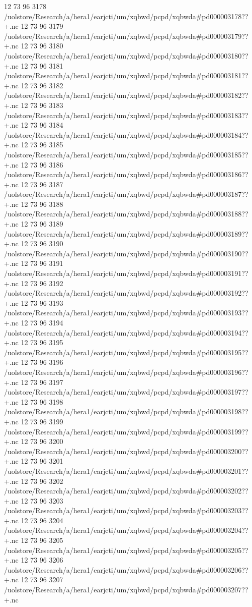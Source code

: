 12 73 96
3178
/uolstore/Research/a/hera1/earjcti/um/xqbwd/pcpd/xqbwda#pd000003178??+.nc
12 73 96
3179
/uolstore/Research/a/hera1/earjcti/um/xqbwd/pcpd/xqbwda#pd000003179??+.nc
12 73 96
3180
/uolstore/Research/a/hera1/earjcti/um/xqbwd/pcpd/xqbwda#pd000003180??+.nc
12 73 96
3181
/uolstore/Research/a/hera1/earjcti/um/xqbwd/pcpd/xqbwda#pd000003181??+.nc
12 73 96
3182
/uolstore/Research/a/hera1/earjcti/um/xqbwd/pcpd/xqbwda#pd000003182??+.nc
12 73 96
3183
/uolstore/Research/a/hera1/earjcti/um/xqbwd/pcpd/xqbwda#pd000003183??+.nc
12 73 96
3184
/uolstore/Research/a/hera1/earjcti/um/xqbwd/pcpd/xqbwda#pd000003184??+.nc
12 73 96
3185
/uolstore/Research/a/hera1/earjcti/um/xqbwd/pcpd/xqbwda#pd000003185??+.nc
12 73 96
3186
/uolstore/Research/a/hera1/earjcti/um/xqbwd/pcpd/xqbwda#pd000003186??+.nc
12 73 96
3187
/uolstore/Research/a/hera1/earjcti/um/xqbwd/pcpd/xqbwda#pd000003187??+.nc
12 73 96
3188
/uolstore/Research/a/hera1/earjcti/um/xqbwd/pcpd/xqbwda#pd000003188??+.nc
12 73 96
3189
/uolstore/Research/a/hera1/earjcti/um/xqbwd/pcpd/xqbwda#pd000003189??+.nc
12 73 96
3190
/uolstore/Research/a/hera1/earjcti/um/xqbwd/pcpd/xqbwda#pd000003190??+.nc
12 73 96
3191
/uolstore/Research/a/hera1/earjcti/um/xqbwd/pcpd/xqbwda#pd000003191??+.nc
12 73 96
3192
/uolstore/Research/a/hera1/earjcti/um/xqbwd/pcpd/xqbwda#pd000003192??+.nc
12 73 96
3193
/uolstore/Research/a/hera1/earjcti/um/xqbwd/pcpd/xqbwda#pd000003193??+.nc
12 73 96
3194
/uolstore/Research/a/hera1/earjcti/um/xqbwd/pcpd/xqbwda#pd000003194??+.nc
12 73 96
3195
/uolstore/Research/a/hera1/earjcti/um/xqbwd/pcpd/xqbwda#pd000003195??+.nc
12 73 96
3196
/uolstore/Research/a/hera1/earjcti/um/xqbwd/pcpd/xqbwda#pd000003196??+.nc
12 73 96
3197
/uolstore/Research/a/hera1/earjcti/um/xqbwd/pcpd/xqbwda#pd000003197??+.nc
12 73 96
3198
/uolstore/Research/a/hera1/earjcti/um/xqbwd/pcpd/xqbwda#pd000003198??+.nc
12 73 96
3199
/uolstore/Research/a/hera1/earjcti/um/xqbwd/pcpd/xqbwda#pd000003199??+.nc
12 73 96
3200
/uolstore/Research/a/hera1/earjcti/um/xqbwd/pcpd/xqbwda#pd000003200??+.nc
12 73 96
3201
/uolstore/Research/a/hera1/earjcti/um/xqbwd/pcpd/xqbwda#pd000003201??+.nc
12 73 96
3202
/uolstore/Research/a/hera1/earjcti/um/xqbwd/pcpd/xqbwda#pd000003202??+.nc
12 73 96
3203
/uolstore/Research/a/hera1/earjcti/um/xqbwd/pcpd/xqbwda#pd000003203??+.nc
12 73 96
3204
/uolstore/Research/a/hera1/earjcti/um/xqbwd/pcpd/xqbwda#pd000003204??+.nc
12 73 96
3205
/uolstore/Research/a/hera1/earjcti/um/xqbwd/pcpd/xqbwda#pd000003205??+.nc
12 73 96
3206
/uolstore/Research/a/hera1/earjcti/um/xqbwd/pcpd/xqbwda#pd000003206??+.nc
12 73 96
3207
/uolstore/Research/a/hera1/earjcti/um/xqbwd/pcpd/xqbwda#pd000003207??+.nc
